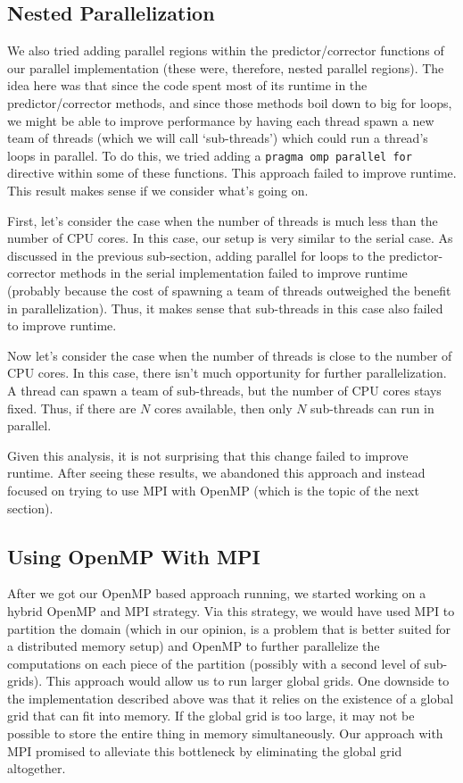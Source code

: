 \documentclass{article}
\begin{document}
\subsection{Nested Parallelization}
We also tried adding parallel regions within the predictor/corrector functions of our parallel implementation (these were, therefore, nested parallel regions).
The idea here was that since the code spent most of its runtime in the predictor/corrector methods, and since those methods boil down to big for loops, we might be able to improve performance by having each thread spawn a new team of threads (which we will call `sub-threads') which could run a thread's loops in parallel.
To do this, we tried adding a \texttt{pragma omp parallel for} directive within some of these functions.
This approach failed to improve runtime.
This result makes sense if we consider what's going on.

First, let's consider the case when the number of threads is much less than the number of CPU cores.
In this case, our setup is very similar to the serial case.
As discussed in the previous sub-section, adding parallel for loops to the predictor-corrector methods in the serial implementation failed to improve runtime (probably because the cost of spawning a team of threads outweighed the benefit in parallelization).
Thus, it makes sense that sub-threads in this case also failed to improve runtime.

Now let's consider the case when the number of threads is close to the number of CPU cores.
In this case, there isn't much opportunity for further parallelization.
A thread can spawn a team of sub-threads, but the number of CPU cores stays fixed.
Thus, if there are $N$ cores available, then only $N$ sub-threads can run in parallel.

Given this analysis, it is not surprising that this change failed to improve runtime. After seeing these results, we abandoned this approach and instead focused on trying to use MPI with OpenMP (which is the topic of the next section).

\subsection{Using OpenMP With MPI}
After we got our OpenMP based approach running, we started working on a hybrid OpenMP and MPI strategy.
Via this strategy, we would have used MPI to partition the domain (which in our opinion, is a problem that is better suited for a distributed memory setup)
and OpenMP to further parallelize the computations on each piece of the partition (possibly with a second level of sub-grids).
This approach would allow us to run larger global grids.
One downside to the implementation described above was that it relies on the existence of a global grid that can fit into memory.
If the global grid is too large, it may not be possible to store the entire thing in memory simultaneously.
Our approach with MPI promised to alleviate this bottleneck by eliminating the global grid altogether.
\end{document}
